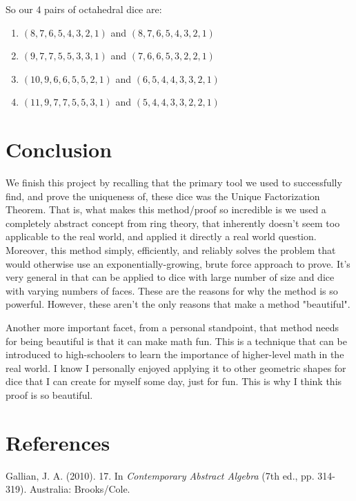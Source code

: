 \documentclass[12pt]{report}
\begin{document}
So our 4 pairs of octahedral dice are:
\begin{enumerate}
\item $(8,7,6,5,4,3,2,1)$ and $(8,7,6,5,4,3,2,1)$
\item $(9,7,7,5,5,3,3,1)$ and $(7,6,6,5,3,2,2,1)$
\item $(10,9,6,6,5,5,2,1)$ and $(6,5,4,4,3,3,2,1)$
\item $(11,9,7,7,5,5,3,1)$ and $(5,4,4,3,3,2,2,1)$
\end{enumerate}

\section*{Conclusion}
We finish this project by recalling that the primary tool we used to successfully find, and prove the uniqueness of, these dice was the Unique Factorization Theorem. That is, what makes this method/proof so incredible is we used a completely abstract concept from ring theory, that inherently doesn't seem too applicable to the real world, and applied it directly a real world question. Moreover, this method simply, efficiently, and reliably solves the problem that would otherwise use an exponentially-growing, brute force approach to prove. It's very general in that can be applied to dice with large number of size and dice with varying numbers of faces. These are the reasons for why the method is so powerful. However, these aren't the only reasons that make a method "beautiful".

Another more important facet, from a personal standpoint, that method needs for being beautiful is that it can make math fun. This is a technique that can be introduced to high-schoolers to learn the importance of higher-level math in the real world. I know I personally enjoyed applying it to other geometric shapes for dice that I can create for myself some day, just for fun. This is why I think this proof is so beautiful.

\section*{References}
Gallian, J. A. (2010). 17. In \textit{Contemporary Abstract Algebra} (7th ed., pp. 314-319). Australia: Brooks/Cole.
\end{document}
